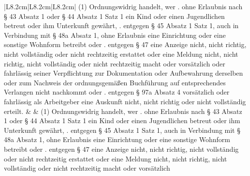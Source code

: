 \documentclass[10pt,a4paper,landscape]{article}
\begin{document}
\begin{longtable}{|L{8.2cm}|L{8.2cm}|L{8.2cm}|}
(1) Ordnungswidrig handelt, wer   .   ohne Erlaubnis nach \S{} 43 Absatz 1 oder  \newline \S{} 44 Absatz 1 Satz 1 ein Kind oder einen  \newline Jugendlichen betreut oder ihm Unterkunft  \newline gewährt,   . entgegen \S{} 45 Absatz 1 Satz 1, auch in  \newline Verbindung mit \S{} 48a Absatz 1, ohne  \newline Erlaubnis eine Einrichtung oder eine  \newline sonstige Wohnform betreibt oder   . entgegen \S{} 47 eine Anzeige nicht, nicht  \newline richtig, nicht vollständig oder nicht  \newline rechtzeitig erstattet oder eine Meldung nicht,  \newline nicht richtig, nicht vollständig oder nicht  \newline rechtzeitig macht oder vorsätzlich oder  \newline fahrlässig seiner Verpflichtung zur  \newline Dokumentation oder Aufbewahrung  derselben oder zum Nachweis der  \newline ordnungsgemäßen Buchführung auf  \newline entsprechendes Verlangen nicht  \newline nachkommt oder   . entgegen \S{} 97a Absatz 4 vorsätzlich oder  \newline fahrlässig als Arbeitgeber eine Auskunft  \newline nicht, nicht richtig oder nicht vollständig  \newline \textcolor{diffred}{erteilt.} &  & (1) Ordnungswidrig handelt, wer   .   ohne Erlaubnis nach \S{} 43 Absatz 1 oder  \newline \S{} 44 Absatz 1 Satz 1 ein Kind oder einen  \newline Jugendlichen betreut oder ihm Unterkunft  \newline gewährt,   . entgegen \S{} 45 Absatz 1 Satz 1, auch in  \newline Verbindung mit \S{} 48a Absatz 1, ohne  \newline Erlaubnis eine Einrichtung oder eine  \newline sonstige Wohnform betreibt oder   . entgegen \S{} 47 eine Anzeige nicht, nicht  \newline richtig, nicht vollständig oder nicht  \newline rechtzeitig erstattet oder eine Meldung nicht,  \newline nicht richtig, nicht vollständig oder nicht  \newline rechtzeitig macht oder vorsätzlich 
\end{longtable}
\end{document}
